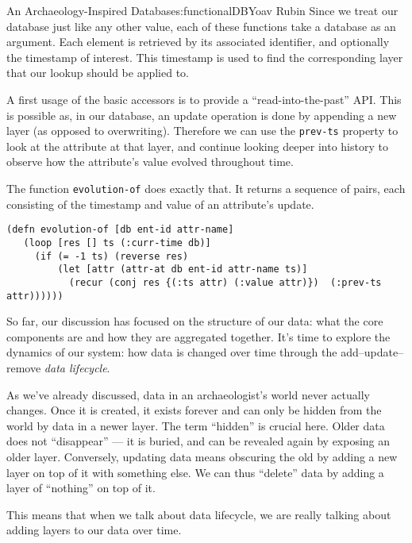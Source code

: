 \begin{aosachapter}{An Archaeology-Inspired Database}{s:functionalDB}{Yoav Rubin}
Since we treat our database just like any other value, each of these
functions take a database as an argument. Each element is retrieved by
its associated identifier, and optionally the timestamp of interest.
This timestamp is used to find the corresponding layer that our lookup
should be applied to.

\label{evolution}

A first usage of the basic accessors is to provide a
``read-into-the-past'' API. This is possible as, in our database, an
update operation is done by appending a new layer (as opposed to
overwriting). Therefore we can use the \texttt{prev-ts} property to look
at the attribute at that layer, and continue looking deeper into history
to observe how the attribute's value evolved throughout time.

The function \texttt{evolution-of} does exactly that. It returns a
sequence of pairs, each consisting of the timestamp and value of an
attribute's update.

\begin{verbatim}
(defn evolution-of [db ent-id attr-name]
   (loop [res [] ts (:curr-time db)]
     (if (= -1 ts) (reverse res)
         (let [attr (attr-at db ent-id attr-name ts)]
           (recur (conj res {(:ts attr) (:value attr)})  (:prev-ts attr))))))
\end{verbatim}

\label{data-behavior-and-life-cycle}

So far, our discussion has focused on the structure of our data: what
the core components are and how they are aggregated together. It's time
to explore the dynamics of our system: how data is changed over time
through the add--update--remove \emph{data lifecycle}.

As we've already discussed, data in an archaeologist's world never
actually changes. Once it is created, it exists forever and can only be
hidden from the world by data in a newer layer. The term ``hidden'' is
crucial here. Older data does not ``disappear'' --- it is buried, and
can be revealed again by exposing an older layer. Conversely, updating
data means obscuring the old by adding a new layer on top of it with
something else. We can thus ``delete'' data by adding a layer of
``nothing'' on top of it.

This means that when we talk about data lifecycle, we are really talking
about adding layers to our data over time.

\label{the-bare-necessities}


\end{aosachapter}
